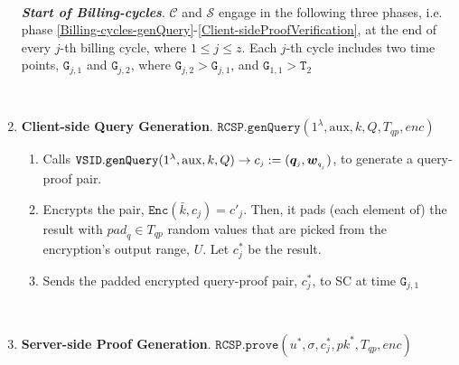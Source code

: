 \begin{enumerate}
\

\textbf{\textit{Start of Billing-cycles}}. $\mathcal{C}$ and $\mathcal{S}$ engage in the following three phases, i.e. phase \ref{Billing-cycles-genQuery}-\ref{Client-sideProofVerification},  at the end of  every $j$-th billing cycle, where $1\leq j\leq z$. Each $j$-th cycle includes two  time points, $\texttt{G}_{\scriptscriptstyle j,1}$ and $\texttt{G}_{\scriptscriptstyle j,2}$, where $\texttt{G}_{\scriptscriptstyle j,2}>\texttt{G}_{\scriptscriptstyle j,1}$, and $\texttt{G}_{\scriptscriptstyle 1,1}>\texttt{T}_{\scriptscriptstyle 2}$ 




\

\item\textbf{Client-side Query Generation}.\label{Billing-cycles-genQuery} $\mathtt{RCSP}.\mathtt{genQuery}(1^\lambda, \text{aux},k,Q, T_{\scriptscriptstyle qp}, enc)$

\begin{enumerate}
\item Calls $\mathtt{VSID.genQuery}(1^{\lambda},  \text{aux},k,Q)\rightarrow c_{\scriptscriptstyle j}:=(\bm{q}_{\scriptscriptstyle j},\bm{w}_{\scriptscriptstyle q_{_{\scaleto{j}{\size}}}})$, to generate a query-proof pair. 
\item Encrypts the pair, $\mathtt{Enc}(\bar{k},c_{\scriptscriptstyle j})=c'_{\scriptscriptstyle j}$. Then, it pads (each element of) the result with ${pad}_{\scriptscriptstyle q}\in T_{\scriptscriptstyle qp}$ random values that are picked from the encryption's output range, $U$. Let $c^{\scriptscriptstyle *}_{\scriptscriptstyle j}$ be the result. 
\item Sends the padded encrypted query-proof pair, $c^{\scriptscriptstyle *}_{\scriptscriptstyle j}$, to SC at time $\texttt{G}_{\scriptscriptstyle j,1}$
\end{enumerate}

\

\item\textbf{Server-side Proof Generation}. $\mathtt{RCSP}.\mathtt{prove}(u^{\scriptscriptstyle *},  \sigma,  c^{\scriptscriptstyle *}_{\scriptscriptstyle j},pk^{\scriptscriptstyle *}, T_{\scriptscriptstyle qp},enc)$



\end{enumerate}
